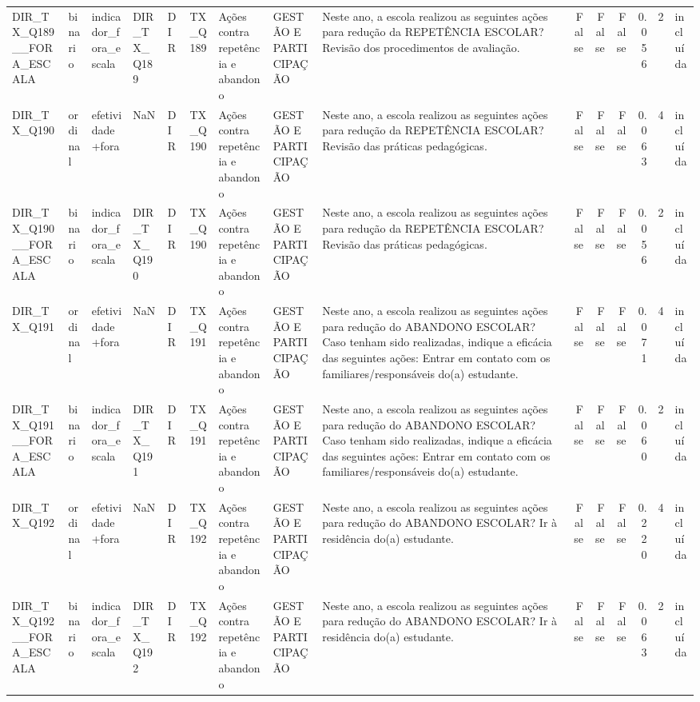 \begin{tabular}{lllllllllrrrrrl}
DIR\_TX\_Q189\_\_FORA\_ESCALA & binario & indicador\_fora\_escala & DIR\_TX\_Q189 & DIR & TX\_Q189 & Ações contra repetência e abandono & GESTÃO E PARTICIPAÇÃO & Neste ano, a escola realizou as seguintes ações para redução da REPETÊNCIA ESCOLAR? Revisão dos procedimentos de avaliação. & False & False & False & 0.056 & 2 & incluída \\
DIR\_TX\_Q190 & ordinal & efetividade+fora & NaN & DIR & TX\_Q190 & Ações contra repetência e abandono & GESTÃO E PARTICIPAÇÃO & Neste ano, a escola realizou as seguintes ações para redução da REPETÊNCIA ESCOLAR? Revisão das práticas pedagógicas. & False & False & False & 0.063 & 4 & incluída \\
DIR\_TX\_Q190\_\_FORA\_ESCALA & binario & indicador\_fora\_escala & DIR\_TX\_Q190 & DIR & TX\_Q190 & Ações contra repetência e abandono & GESTÃO E PARTICIPAÇÃO & Neste ano, a escola realizou as seguintes ações para redução da REPETÊNCIA ESCOLAR? Revisão das práticas pedagógicas. & False & False & False & 0.056 & 2 & incluída \\
DIR\_TX\_Q191 & ordinal & efetividade+fora & NaN & DIR & TX\_Q191 & Ações contra repetência e abandono & GESTÃO E PARTICIPAÇÃO & Neste ano, a escola realizou as seguintes ações para redução do ABANDONO ESCOLAR? Caso tenham sido realizadas, indique a eficácia das seguintes ações: Entrar em contato com os familiares/responsáveis do(a) estudante. & False & False & False & 0.071 & 4 & incluída \\
DIR\_TX\_Q191\_\_FORA\_ESCALA & binario & indicador\_fora\_escala & DIR\_TX\_Q191 & DIR & TX\_Q191 & Ações contra repetência e abandono & GESTÃO E PARTICIPAÇÃO & Neste ano, a escola realizou as seguintes ações para redução do ABANDONO ESCOLAR? Caso tenham sido realizadas, indique a eficácia das seguintes ações: Entrar em contato com os familiares/responsáveis do(a) estudante. & False & False & False & 0.060 & 2 & incluída \\
DIR\_TX\_Q192 & ordinal & efetividade+fora & NaN & DIR & TX\_Q192 & Ações contra repetência e abandono & GESTÃO E PARTICIPAÇÃO & Neste ano, a escola realizou as seguintes ações para redução do ABANDONO ESCOLAR? Ir à residência do(a) estudante. & False & False & False & 0.220 & 4 & incluída \\
DIR\_TX\_Q192\_\_FORA\_ESCALA & binario & indicador\_fora\_escala & DIR\_TX\_Q192 & DIR & TX\_Q192 & Ações contra repetência e abandono & GESTÃO E PARTICIPAÇÃO & Neste ano, a escola realizou as seguintes ações para redução do ABANDONO ESCOLAR? Ir à residência do(a) estudante. & False & False & False & 0.063 & 2 & incluída \\

\end{tabular}
